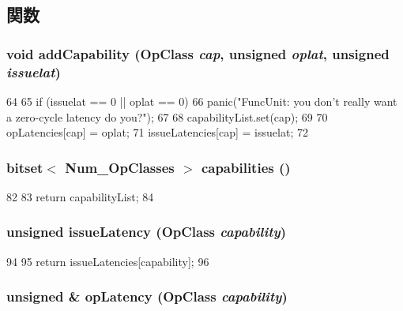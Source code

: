 \subsection{関数}
\hypertarget{classFuncUnit_a458c37aed70ce3c9f1dc77bc7a214bb0}{
\subsubsection[{addCapability}]{\setlength{\rightskip}{0pt plus 5cm}void addCapability ({\bf OpClass} {\em cap}, \/  unsigned {\em oplat}, \/  unsigned {\em issuelat})}}
\label{classFuncUnit_a458c37aed70ce3c9f1dc77bc7a214bb0}



\begin{DoxyCode}
64 {
65     if (issuelat == 0 || oplat == 0)
66         panic("FuncUnit:  you don't really want a zero-cycle latency do you?");
67 
68     capabilityList.set(cap);
69 
70     opLatencies[cap] = oplat;
71     issueLatencies[cap] = issuelat;
72 }
\end{DoxyCode}
\hypertarget{classFuncUnit_afd7df91cd73d387e2eea82bc37627a82}{
\subsubsection[{capabilities}]{\setlength{\rightskip}{0pt plus 5cm}bitset$<$ {\bf Num\_\-OpClasses} $>$ capabilities ()}}
\label{classFuncUnit_afd7df91cd73d387e2eea82bc37627a82}



\begin{DoxyCode}
82 {
83     return capabilityList;
84 }
\end{DoxyCode}
\hypertarget{classFuncUnit_ae99683f3f3b0a28689755b5ee0c17ee1}{
\subsubsection[{issueLatency}]{\setlength{\rightskip}{0pt plus 5cm}unsigned issueLatency ({\bf OpClass} {\em capability})}}
\label{classFuncUnit_ae99683f3f3b0a28689755b5ee0c17ee1}



\begin{DoxyCode}
94 {
95     return issueLatencies[capability];
96 }
\end{DoxyCode}
\hypertarget{classFuncUnit_a0e6879ee1a14f16e57a772b29af05533}{
\subsubsection[{opLatency}]{\setlength{\rightskip}{0pt plus 5cm}unsigned \& opLatency ({\bf OpClass} {\em capability})}}
\label{classFuncUnit_a0e6879ee1a14f16e57a772b29af05533}



